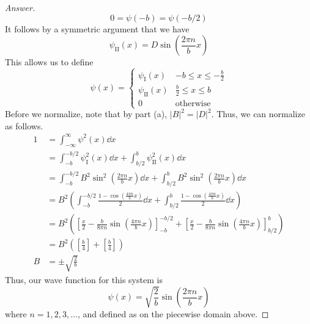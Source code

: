\documentclass[../psets.tex]{subfiles}
\begin{document}
\begin{enumerate}
\begin{enumerate}
\begin{proof}[Answer]
\begin{equation*}
                0 = \psi(-b) = \psi(-b/2)
            \end{equation*}
            It follows by a symmetric argument that we have
            \begin{equation*}
                \psi_\text{II}(x) = D\sin\left( \frac{2\pi n}{b}x \right)
            \end{equation*}
            This allows us to define
            \begin{equation*}
                \psi(x) =
                \begin{cases}
                    \psi_\text{I}(x)  & -b\leq x\leq -\frac{b}{2}\\
                    \psi_\text{II}(x) & \frac{b}{2}\leq x\leq b\\
                    0 & \text{otherwise}
                \end{cases}
            \end{equation*}
            Before we normalize, note that by part (a), $|B|^2=|D|^2$. Thus, we can normalize as follows.
            \begin{align*}
                1 &= \int_{-\infty}^\infty\psi^2(x)\dd{x}\\
                &= \int_{-b}^{-b/2}\psi_\text{I}^2(x)\dd{x}+\int_{b/2}^b\psi_\text{II}^2(x)\dd{x}\\
                &= \int_{-b}^{-b/2}B^2\sin^2\left( \frac{2\pi n}{b}x \right)\dd{x}+\int_{b/2}^bB^2\sin^2\left( \frac{2\pi n}{b}x \right)\dd{x}\\
                &= B^2\left( \int_{-b}^{-b/2}\frac{1-\cos\left( \frac{4\pi n}{b}x \right)}{2}\dd{x}+\int_{b/2}^b\frac{1-\cos\left( \frac{4\pi n}{b}x \right)}{2}\dd{x} \right)\\
                &= B^2\left( \left[ \frac{x}{2}-\frac{b}{8\pi n}\sin\left( \frac{4\pi n}{b}x \right) \right]_{-b}^{-b/2}+\left[ \frac{x}{2}-\frac{b}{8\pi n}\sin\left( \frac{4\pi n}{b}x \right) \right]_{b/2}^b \right)\\
                &= B^2\left( \left[ \frac{b}{4} \right]+\left[ \frac{b}{4} \right] \right)\\
                B &= \pm\sqrt{\frac{2}{b}}
            \end{align*}
            Thus, our wave function for this system is
            \begin{equation*}
                \boxed{\psi(x) = \sqrt{\frac{2}{b}}\sin\left( \frac{2\pi n}{b}x \right)}
            \end{equation*}
            where $n=1,2,3,\dots$, and defined as on the piecewise domain above.\par

\end{proof}
\end{enumerate}
\end{enumerate}
\end{document}
